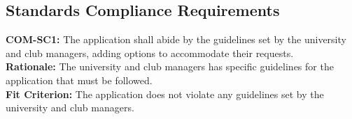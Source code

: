 \documentclass[12pt]{article}
\begin{document}
\subsection{Standards Compliance Requirements}
  \textbf{COM-SC1:} The application shall abide by the guidelines set by the university and club managers, adding options to accommodate their requests.\\
  \textbf{Rationale:} The university and club managers has specific guidelines for the application that must be followed.\\
  \textbf{Fit Criterion:} The application does not violate any guidelines set by the university and club managers.\\\\
\end{document}
